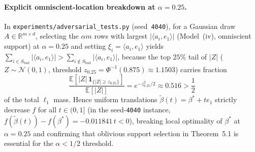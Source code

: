 \documentclass[11pt]{article}
\newcommand{\R}{\mathbb{R}}
\newcommand{\E}{\mathbb{E}}
\newcommand{\ind}{\mathbf{1}}
\newcommand{\ip}[2]{\langle #1, #2 \rangle}
\newcommand{\Fnorm}[1]{\|#1\|_F}
\begin{document}
\begin{table}[htbp]
  \centering
  \footnotesize
  \caption{Experiment~D 5-seed comparison (\nolinkurl{experiments/results/geom_decay_comparison.json}, seeds \texttt{20261123--20261127}, $d=20, r=3, m=500$, $250$ iterations, $\pm 100$ oblivious outliers): final distance $\Fnorm{\beta^{(250)} - \beta^*}$ from identical local initialization $\Fnorm{\beta^{(0)} - \beta^*} = 0.25$ for oracle-$f(\beta^*)$ \texttt{PolyakSGM} versus $f(\beta^*)$-free \texttt{GeomDecaySGM} ($\lambda_0 = 0.04, q = 0.95$).}
  \label{tab:sm-geom}
\end{table}

\paragraph{Explicit omniscient-location breakdown at $\alpha = 0.25$.}
In \nolinkurl{experiments/adversarial_tests.py} (seed~\texttt{4040}), for a Gaussian draw $A \in \R^{m \times d}$, selecting the $\alpha m$ rows with largest $|\ip{a_i}{e_1}|$ (Model~(iv), omniscient support) at $\alpha = 0.25$ and setting $\xi_i = \ip{a_i}{e_1}$ yields $\sum_{i \in S_{\mathrm{bad}}} |\ip{a_i}{e_1}| > \sum_{i \notin S_{\mathrm{bad}}} |\ip{a_i}{e_1}|$, because the top $25\%$ tail of $|Z|$ ($Z \sim \mathcal{N}(0, 1)$, threshold $z_{0.25} = \Phi^{-1}(0.875) \approx 1.1503$) carries fraction
\[
  \frac{\E[|Z|\,\ind_{\{|Z| \ge z_{0.25}\}}]}{\E[|Z|]} = e^{-z_{0.25}^2 / 2} \approx 0.516 > \frac{1}{2}
\]
of the total $\ell_1$ mass. Hence uniform translations $\tilde\beta(t) = \beta^* + t e_1$ strictly decrease $f$ for all $t \in (0, 1]$ (in the seed-\texttt{4040} instance, $f(\tilde\beta(t)) - f(\beta^*) = -0.011841\,t < 0$), breaking local optimality of $\beta^*$ at $\alpha = 0.25$ and confirming that oblivious support selection in Theorem~5.1 is essential for the $\alpha < 1/2$ threshold.
\end{document}
